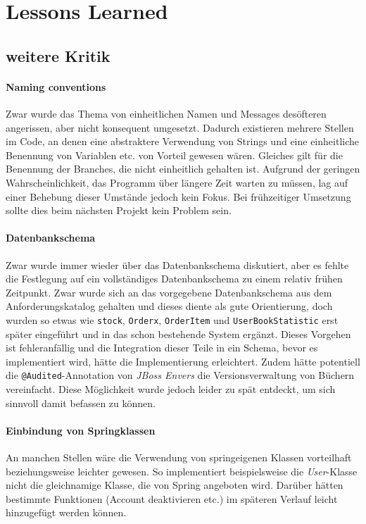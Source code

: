 \section{Lessons Learned}

	\subsection{weitere Kritik}	
		\paragraph{Naming conventions} Zwar wurde das Thema von einheitlichen Namen und Messages desöfteren angerissen, aber nicht konsequent umgesetzt. Dadurch existieren mehrere Stellen im Code, an denen eine abstraktere Verwendung von Strings und eine einheitliche Benennung von Variablen etc. von Vorteil gewesen wären. Gleiches gilt für die Benennung der Branches, die nicht einheitlich gehalten ist. Aufgrund der geringen Wahrscheinlichkeit, das Programm über längere Zeit warten zu müssen, lag auf einer Behebung dieser Umstände jedoch kein Fokus. Bei frühzeitiger Umsetzung sollte dies beim nächsten Projekt kein Problem sein.
		
		\paragraph{Datenbankschema} Zwar wurde immer wieder über das Datenbankschema diskutiert, aber es fehlte die Festlegung auf ein vollständiges Datenbankschema zu einem relativ frühen Zeitpunkt. Zwar wurde sich an das vorgegebene Datenbankschema aus dem Anforderungskatalog gehalten und dieses diente als gute Orientierung, doch wurden so etwas wie \texttt{stock}, \texttt{Orderx}, \texttt{OrderItem} und \texttt{UserBookStatistic} erst später eingeführt und in das schon bestehende System ergänzt. Dieses Vorgehen ist fehleranfällig und die Integration dieser Teile in ein Schema, bevor es implementiert wird, hätte die Implementierung erleichtert. Zudem hätte potentiell die \texttt{@Audited}-Annotation von \textit{JBoss Envers} die Versionsverwaltung von Büchern vereinfacht. Diese Möglichkeit wurde jedoch leider zu spät entdeckt, um sich sinnvoll damit befassen zu können.
		
		\paragraph{Einbindung von Springklassen} An manchen Stellen wäre die Verwendung von spring\-eigenen Klassen vorteilhaft beziehungsweise leichter gewesen. So implementiert beispielsweise die \textit{User}-Klasse nicht die gleichnamige Klasse, die von Spring angeboten wird. Darüber hätten bestimmte Funktionen (Account deaktivieren etc.) im späteren Verlauf leicht hinzugefügt werden können.
		
